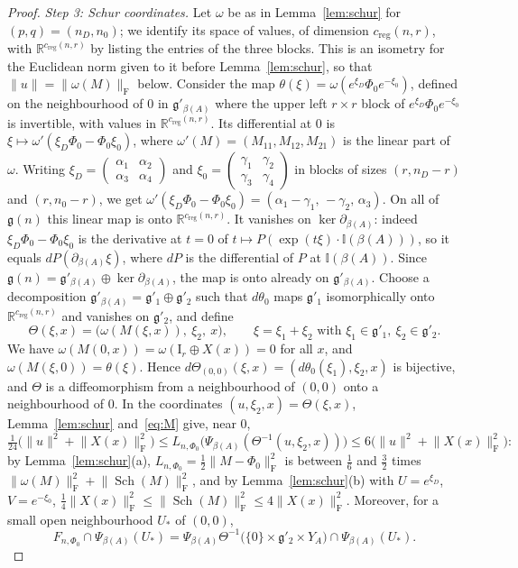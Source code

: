 \documentclass[11pt,a4paper]{article}
\theoremstyle{definition}
\theoremstyle{remark}
\numberwithin{equation}{section}
\newcommand{\R}{\mathbb{R}}
\newcommand{\Sch}{\operatorname{Sch}}
\newcommand{\id}{\mathrm{I}}
\newcommand{\Fr}[1]{\lVert #1\rVert_{\mathrm F}}
\newcommand{\norm}[1]{\lVert #1\rVert}
\newcommand{\creg}{c_{\mathrm{reg}}}
\newcommand{\I}{\mathbb I}
\newcommand{\g}{\mathfrak g}
\begin{document}
\begin{proof}
\emph{Step 3: Schur coordinates.} Let $\omega$ be as in Lemma~\ref{lem:schur} for $(p,q)=(n_D,n_0)$; we identify its space of values, of dimension $\creg(n,r)$, with $\R^{\creg(n,r)}$ by listing the entries of the three blocks. This is an isometry for the Euclidean norm given to it before Lemma~\ref{lem:schur}, so that $\norm u=\Fr{\omega(M)}$ below. Consider the map $\theta(\xi)=\omega(e^{\xi_D}\Phi_0e^{-\xi_0})$, defined on the neighbourhood of $0$ in $\g'_{\beta(A)}$ where the upper left $r\times r$ block of $e^{\xi_D}\Phi_0e^{-\xi_0}$ is invertible, with values in $\R^{\creg(n,r)}$. Its differential at $0$ is $\xi\mapsto\omega'(\xi_D\Phi_0-\Phi_0\xi_0)$, where $\omega'(M)=(M_{11},M_{12},M_{21})$ is the linear part of $\omega$. Writing $\xi_D=\begin{pmatrix}\alpha_1&\alpha_2\\\alpha_3&\alpha_4\end{pmatrix}$ and $\xi_0=\begin{pmatrix}\gamma_1&\gamma_2\\\gamma_3&\gamma_4\end{pmatrix}$ in blocks of sizes $(r,n_D-r)$ and $(r,n_0-r)$, we get $\omega'(\xi_D\Phi_0-\Phi_0\xi_0)=(\alpha_1-\gamma_1,\,-\gamma_2,\,\alpha_3)$. On all of $\g(n)$ this linear map is onto $\R^{\creg(n,r)}$. It vanishes on $\ker\partial_{\beta(A)}$: indeed $\xi_D\Phi_0-\Phi_0\xi_0$ is the derivative at $t=0$ of $t\mapsto P(\exp(t\xi)\cdot\I(\beta(A)))$, so it equals $dP(\partial_{\beta(A)}\xi)$, where $dP$ is the differential of $P$ at $\I(\beta(A))$. Since $\g(n)=\g'_{\beta(A)}\oplus\ker\partial_{\beta(A)}$, the map is onto already on $\g'_{\beta(A)}$. Choose a decomposition $\g'_{\beta(A)}=\g'_1\oplus\g'_2$ such that $d\theta_0$ maps $\g'_1$ isomorphically onto $\R^{\creg(n,r)}$ and vanishes on $\g'_2$, and define
\[
\Theta(\xi,x)=\bigl(\omega(M(\xi,x)),\ \xi_2,\ x\bigr),\qquad\xi=\xi_1+\xi_2\text{ with }\xi_1\in\g'_1,\ \xi_2\in\g'_2 .
\]
We have $\omega(M(0,x))=\omega(\id_r\oplus X(x))=0$ for all $x$, and $\omega(M(\xi,0))=\theta(\xi)$. Hence $d\Theta_{(0,0)}(\xi,x)=(d\theta_0(\xi_1),\xi_2,x)$ is bijective, and $\Theta$ is a diffeomorphism from a neighbourhood of $(0,0)$ onto a neighbourhood of $0$. In the coordinates $(u,\xi_2,x)=\Theta(\xi,x)$, Lemma~\ref{lem:schur} and~\eqref{eq:M} give, near $0$,
\begin{equation}\label{eq:reduced}
\tfrac1{24}\bigl(\norm u^2+\Fr{X(x)}^2\bigr)\le L_{n,\Phi_0}\bigl(\Psi_{\beta(A)}(\Theta^{-1}(u,\xi_2,x))\bigr)\le6\bigl(\norm u^2+\Fr{X(x)}^2\bigr):
\end{equation}
by Lemma~\ref{lem:schur}(a), $L_{n,\Phi_0}=\frac12\Fr{M-\Phi_0}^2$ is between $\frac16$ and $\frac32$ times $\Fr{\omega(M)}^2+\Fr{\Sch(M)}^2$, and by Lemma~\ref{lem:schur}(b) with $U=e^{\xi_D}$, $V=e^{-\xi_0}$, $\frac14\Fr{X(x)}^2\le\Fr{\Sch(M)}^2\le4\Fr{X(x)}^2$. Moreover, for a small open neighbourhood $U_*$ of $(0,0)$,
\[
F_{n,\Phi_0}\cap\Psi_{\beta(A)}(U_*)=\Psi_{\beta(A)}\Theta^{-1}\bigl(\{0\}\times\g'_2\times Y_A\bigr)\cap\Psi_{\beta(A)}(U_*).
\]


\end{proof}
\end{document}
